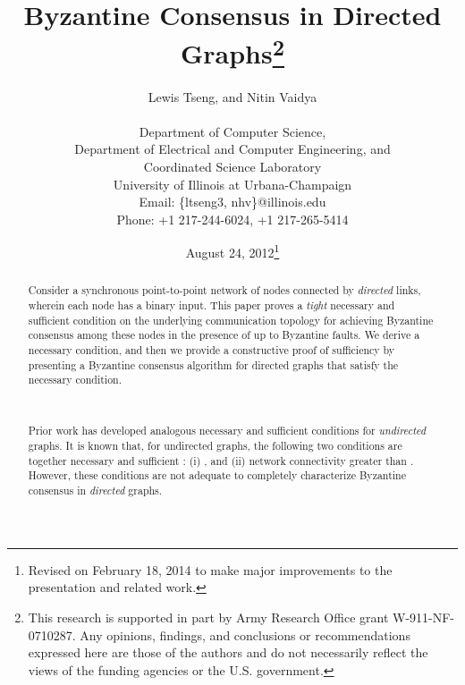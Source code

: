 \documentclass[letterpaper, 11pt]{article}
\begin{document}
\title{Byzantine Consensus in Directed Graphs\footnote{\normalsize This research is supported in part by Army Research Office grant W-911-NF-0710287. Any opinions, findings, and conclusions or recommendations expressed here are those of the authors and do not necessarily reflect the views of the funding agencies or the U.S. government.}}



\author{Lewis Tseng, and Nitin Vaidya\\~\\
 \normalsize  Department of Computer Science,\\
 \normalsize  Department of Electrical and Computer Engineering, 
 and\\ \normalsize  Coordinated Science Laboratory\\ \normalsize University of Illinois at Urbana-Champaign\\ \normalsize Email: \{ltseng3, nhv\}@illinois.edu \\ \normalsize Phone: +1 217-244-6024, +1 217-265-5414}


\date{August 24, 2012\footnote{Revised on February 18, 2014 to make major improvements to the presentation and related work.}}
\maketitle



\begin{abstract}
\normalsize

Consider a synchronous point-to-point network of  nodes connected by {\em directed} links, wherein each node has a binary input. 
This paper proves a {\em tight} necessary and sufficient condition on the underlying communication topology for
achieving Byzantine consensus among these nodes in the presence of
up to  Byzantine faults. We derive a necessary condition, and then we provide a constructive proof of
sufficiency by presenting a Byzantine consensus algorithm for directed graphs
that satisfy the necessary condition. 

~

Prior work has developed analogous necessary and sufficient conditions
for {\em undirected} graphs. It is known that, for undirected graphs,
the following two conditions are
together necessary and sufficient \cite{impossible_proof_lynch, welch_book,dolev_82_BG}:
(i) , and (ii) network connectivity greater than .
However, these conditions are not adequate to completely characterize Byzantine consensus
in {\em directed} graphs.


\end{abstract}
\end{document}
